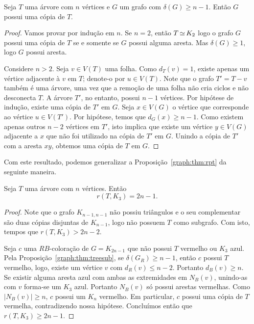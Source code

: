 \begin{proposition}
\label{graph:thm:treesub}
Seja $T$ uma árvore com $n$ vértices e $G$ um grafo com $\delta(G) \geq n-1$. Então $G$ possui uma cópia de $T$.
\end{proposition}
\begin{proof}
Vamos provar por indução em $n$. Se $n = 2$, então $T \operatorname{\simeq} K_2$ logo o grafo $G$ possui uma cópia de $T$ se e somente se $G$ possui alguma aresta. Mas $\delta(G) \geq 1$, logo $G$ possui aresta.

Considere $n > 2$. Seja $v \in V(T)$ uma folha. Como $d_T(v) =1$, existe apenas um vértice adjacente à $v$ em $T$; denote-o por $u \in V(T)$. Note que o grafo $T' = T - v$ também é uma árvore, uma vez que a remoção de uma folha não cria ciclos e não desconecta $T$. A árvore $T'$, no entanto, possui $n-1$ vértices. Por hipótese de indução, existe uma cópia de $T'$ em $G$. Seja $x \in V(G)$ o vértice que corresponde ao vértice $u \in V(T')$.
Por hipótese, temos que $d_G(x) \geq n-1$. Como existem apenas outros $n-2$ vértices em $T'$, isto implica que existe um vértice $y \in V(G)$ adjacente a $x$ que não foi utilizado na cópia de $T'$ em $G$. Unindo a cópia de $T'$ com a aresta $xy$, obtemos uma cópia de $T$ em $G$.
\end{proof}

Com este resultado, podemos generalizar a Proposição~\ref{graph:thm:rpt} da seguinte maneira.

\begin{proposition}
\label{graph:thm:ramseytree}
Seja $T$ uma árvore com $n$ vértices. Então
\[r(T,K_3) = 2n - 1.\]
\end{proposition}
\begin{proof}
Note que o grafo $K_{n-1,n-1}$ não possiu triângulos e o seu complementar são duas cópias disjuntas de $K_{n-1}$, logo não possuem $T$ como subgrafo. Com isto, tempos que $r(T,K_3) > 2n - 2$.

Seja $c$ uma $RB$-coloração de $G = K_{2n-1}$ que não possui $T$ vermelho ou $K_3$ azul. Pela Proposição~\ref{graph:thm:treesub}, se $\delta(G_R) \geq n-1$, então $c$ possui $T$ vermelho, logo, existe um vértice $v$ com $d_R(v) \leq n - 2$. Portanto $d_B(v) \geq n$. Se existir alguma aresta azul com ambas as extremidades em $N_B(v)$, unindo-as com $v$ forma-se um $K_3$ azul.
Portanto $N_B(v)$ só possui arestas vermelhas. Como $|N_B(v)| \geq n$, $c$ possui um $K_n$ vermelho. Em particular, $c$ possui uma cópia de $T$ vermelha, contradizendo nossa hipótese. Concluímos então que $r(T,K_3) \geq 2n - 1$.
\end{proof}

